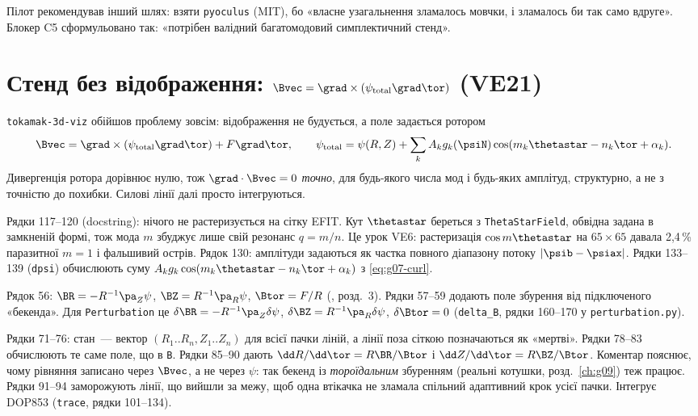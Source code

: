 Пілот рекомендував інший шлях: взяти \texttt{pyoculus} (MIT), бо «власне узагальнення зламалось мовчки, і зламалось би так само вдруге». Блокер C5 сформульовано так: «потрібен валідний багатомодовий симплектичний стенд».

\section{Стенд без відображення: \texorpdfstring{$\Bvec=\grad\times(\psi_{\mathrm{total}}\grad\tor)$}{B = rot(ψ∇φ)} (VE21)}\label{sec:g07-stand}

\texttt{tokamak-3d-viz} обійшов проблему зовсім: відображення не будується, а поле задається ротором
\begin{equation}\label{eq:g07-curl}
  \Bvec=\grad\times(\psi_{\mathrm{total}}\grad\tor)+F\grad\tor,\qquad
  \psi_{\mathrm{total}}=\psi(R,Z)+\sum_kA_kg_k(\psiN)\cos(m_k\thetastar-n_k\tor+\alpha_k).
\end{equation}
Дивергенція ротора дорівнює нулю, тож $\grad\cdot\Bvec=0$ \emph{точно}, для будь-якого числа мод і будь-яких амплітуд, структурно, а не з точністю до похибки. Силові лінії далі просто інтегруються.


Рядки 117--120 (docstring): нічого не растеризується на сітку EFIT. Кут $\thetastar$ береться з \texttt{ThetaStarField}, обвідна задана в замкненій формі, тож мода $m$ збуджує лише свій резонанс $q=m/n$. Це урок VE6: растеризація $\cos m\thetastar$ на $65\times65$ давала 2,4\,\% паразитної $m=1$ і фальшивий острів. Рядок 130: амплітуди задаються як частка повного діапазону потоку $|\psib-\psiax|$. Рядки 133--139 (\texttt{dpsi}) обчислюють суму $A_kg_k\cos(m_k\thetastar-n_k\tor+\alpha_k)$ з \eqref{eq:g07-curl}.


Рядок 56: $\BR=-R^{-1}\pa_Z\psi$, $\BZ=R^{-1}\pa_R\psi$, $\Btor=F/R$ (\cite{Manual}, розд.~3). Рядки 57--59 додають поле збурення від підключеного «бекенда». Для \texttt{Perturbation} це $\delta\BR=-R^{-1}\pa_Z\delta\psi$, $\delta\BZ=R^{-1}\pa_R\delta\psi$, $\delta\Btor=0$ (\texttt{delta\_B}, рядки 160--170 у \texttt{perturbation.py}).


Рядки 71--76: стан~--- вектор $(R_1..R_n,Z_1..Z_n)$ для всієї пачки ліній, а лінії поза сіткою позначаються як «мертві». Рядки 78--83 обчислюють те саме поле, що в \texttt{B}. Рядки 85--90 дають $\dd R/\dd\tor=R\BR/\Btor$ і $\dd Z/\dd\tor=R\BZ/\Btor$. Коментар пояснює, чому рівняння записано через $\Bvec$, а не через $\psi$: так бекенд із \emph{тороїдальним} збуренням (реальні котушки, розд.~\ref{ch:g09}) теж працює. Рядки 91--94 заморожують лінії, що вийшли за межу, щоб одна втікачка не зламала спільний адаптивний крок усієї пачки. Інтегрує DOP853 (\texttt{trace}, рядки 101--134).

